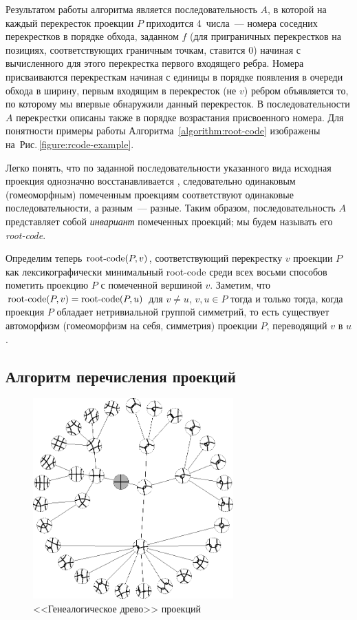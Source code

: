 \documentclass[12pt]{article}
\theoremstyle{plain}
\theoremstyle{definition}
\def\figureref#1{Рис.\,\protect\ref{#1}}
\def\RC{\hbox{root-code}}
\begin{document}
		Результатом работы алгоритма является последовательность $A$, в которой на каждый перекресток
		проекции $P$ приходится 4~числа~--- номера соседних перекрестков в порядке обхода, заданном
		$f$ (для приграничных перекрестков на позициях, соответствующих граничным точкам, ставится $0$)
		начиная с вычисленного для этого перекрестка первого входящего ребра.
		Номера присваиваются перекресткам начиная с единицы в порядке появления в очереди обхода в ширину,
		первым входящим в перекресток (не $v$) ребром объявляется то, по которому мы впервые обнаружили данный
		перекресток. В последовательности $A$ перекрестки описаны также в порядке возрастания присвоенного номера.
		Для понятности примеры работы Алгоритма~\ref{algorithm:root-code} изображены на~\figureref{figure:rcode-example}.

		Легко понять, что по заданной последовательности указанного вида исходная проекция однозначно
		восстанавливается \cite{BogdanovMeshkovOmelchenkoPetrov2011}, следовательно одинаковым (гомеоморфным) помеченным
		проекциям соответствуют одинаковые последовательности, а разным~--- разные. Таким образом, последовательность $A$
		представляет собой \textit{инвариант} помеченных проекций; мы будем называть его \textit{root-code}.

		Определим теперь $\RC(P,v)$, соответствующий перекрестку $v$ проекции $P$ как лексикографически
		минимальный \RC{} среди всех восьми способов пометить проекцию $P$ с помеченной вершиной $v$.
		Заметим, что $\RC(P,v)=\RC(P,u)$ для $v\neq u$, $v,u\in P$ тогда и только тогда, когда проекция
		$P$ обладает нетривиальной группой симметрий, то есть существует автоморфизм (гомеоморфизм на
		себя, симметрия) проекции $P$, переводящий $v$ в $u$.

	\subsection{Алгоритм перечисления проекций}
	\label{subsection:projections-algorithm}

		\begin{figure}[ht]
			\centering
			\includegraphics[width=77mm]{c/genealogical-tree.eps}
			\caption{\footnotesize <<Генеалогическое древо>> проекций\label{figure:genealogical-tree}}
		\end{figure}
\end{document}
